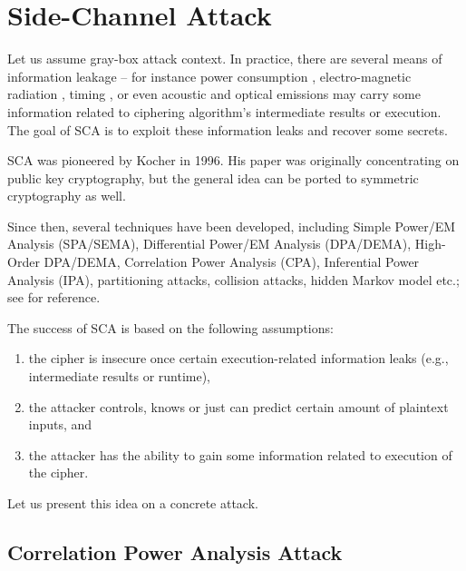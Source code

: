 \section{Side-Channel Attack}
\label{sec:side}

Let us assume gray-box attack context. In practice, there are several means of information leakage -- for instance power consumption \cite{kocher1999differential}, electro-magnetic radiation \cite{agrawal2002side,gandolfi2001electromagnetic,quisquater2001electromagnetic}, timing \cite{kocher1996timing}, or even acoustic \cite{asonov2004keyboard} and optical \cite{kuhn2002optical,loughry2002information} emissions may carry some information related to ciphering algorithm's intermediate results or execution. The goal of SCA is to exploit these information leaks and recover some secrets.

SCA was pioneered by Kocher \cite{kocher1996timing} in 1996. His paper was originally concentrating on public key cryptography, but the general idea can be ported to symmetric cryptography as well.

Since then, several techniques have been developed, including Simple Power/EM Analysis (SPA/SEMA), Differential Power/EM Analysis (DPA/DEMA), High-Order DPA/DEMA, Correlation Power Analysis (CPA), Inferential Power Analysis (IPA), partitioning attacks, collision attacks, hidden Markov model etc.; see \cite[Chapters~13-14]{koc2008cryptographic} for reference.

The success of SCA is based on the following assumptions:
\begin{enumerate}
	\item the cipher is insecure once certain execution-related information leaks (e.g., intermediate results or runtime),
	\item the attacker controls, knows or just can predict certain amount of plaintext inputs, and
	\item the attacker has the ability to gain some information related to execution of the cipher.
\end{enumerate}
Let us present this idea on a concrete attack.



\subsection{Correlation Power Analysis Attack}

